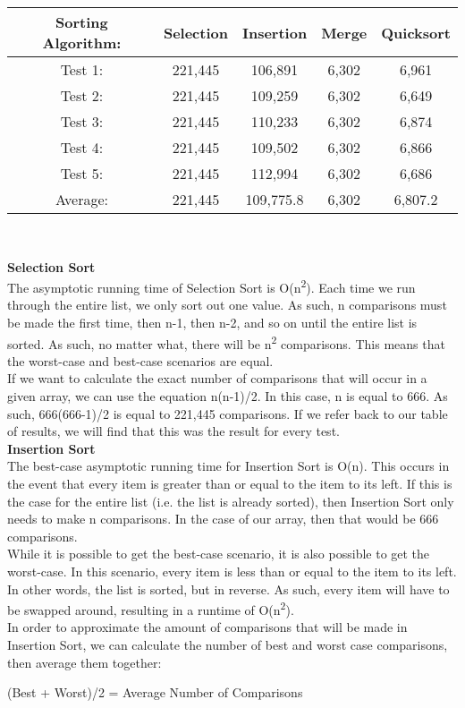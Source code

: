 \documentclass{article}
\begin{document}
\begin{center}
\begin{tabular}{||c | c c c c||} 
 \hline
 Sorting Algorithm: & Selection & Insertion & Merge & Quicksort\\ [0.5ex] 
 \hline\hline
 Test 1: & 221,445 & 106,891 & 6,302 & 6,961\\ 
 \hline
 Test 2: & 221,445 & 109,259 & 6,302 & 6,649\\
 \hline
 Test 3: & 221,445 & 110,233 & 6,302 & 6,874\\
 \hline
 Test 4: & 221,445 & 109,502 & 6,302 & 6,866\\
 \hline
 Test 5: & 221,445 & 112,994 & 6,302 & 6,686\\
 \hline
 Average: & 221,445 & 109,775.8 & 6,302 & 6,807.2\\ [1ex] 
 \hline
\end{tabular}
\\
\end{center}

\textbf{Selection Sort} \\
The asymptotic running time of Selection Sort is O(n\textsuperscript{2}). Each time we run through the entire list, we only sort out one value. As such, n comparisons must be made the first time, then n-1, then n-2, and so on until the entire list is sorted. As such, no matter what, there will be n\textsuperscript{2} comparisons. This means that the worst-case and best-case scenarios are equal. \\
If we want to calculate the exact number of comparisons that will occur in a given array, we can use the equation n(n-1)/2. In this case, n is equal to 666. As such, 666(666-1)/2 is equal to 221,445 comparisons. If we refer back to our table of results, we will find that this was the result for every test.\\

\textbf{Insertion Sort} \\
The best-case asymptotic running time for Insertion Sort is O(n). This occurs in the event that every item is greater than or equal to the item to its left. If this is the case for the entire list (i.e. the list is already sorted), then Insertion Sort only needs to make n comparisons. In the case of our array, then that would be 666 comparisons.\\
While it is possible to get the best-case scenario, it is also possible to get the worst-case. In this scenario, every item is less than or equal to the item to its left. In other words, the list is sorted, but in reverse. As such, every item will have to be swapped around, resulting in a runtime of O(n\textsuperscript{2}).\\
In order to approximate the amount of comparisons that will be made in Insertion Sort, we can calculate the number of best and worst case comparisons, then average them together:
\begin{center} 
(Best + Worst)/2 = Average Number of Comparisons
\end{center}
\end{document}
